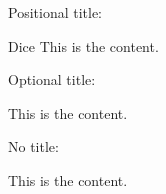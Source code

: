 \documentclass{article}
\begin{document}
Positional title:
\begin{examplebox}{Dice}
This is the content.
\end{examplebox}

Optional title:
\begin{examplebox}[title={Dice}]
This is the content.
\end{examplebox}

No title:
\begin{examplebox}
This is the content.
\end{examplebox}
\end{document}
